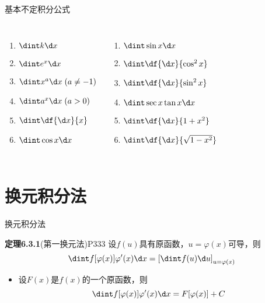 \begin{frame}{基本不定积分公式}
	\linespread{1.2}
	\begin{columns}\pause 
			\begin{enumerate}
			  \item $\dint k\d x$\pause 
			  \item $\dint e^x\d x$\pause 
			  \item $\dint x^a\d x\;(a\ne -1)$\pause 
			  \item $\dint a^x\d x\;(a>0)$\pause 
			  \item $\dint \df {\d x}{x}$\pause 
			  \item $\dint \cos x\d x$\pause 
			\end{enumerate}
			\begin{enumerate}
			  \addtocounter{enumi}{6} 
			  \item $\dint \sin x\d x$\pause 
			  \item $\dint \df{\d x}{\cos^2x}$\pause 
			  \item $\dint \df{\d x}{\sin^2 x}$\pause 
			  \item $\dint \sec x\tan x \d x$\pause 
			  \item $\dint \df{\d x}{1+x^2}$\pause 
			  \item $\dint \df{\d x}{\sqrt{1-x^2}}$
			\end{enumerate}
	\end{columns}
\end{frame}

\section{换元积分法}

\begin{frame}{换元积分法}
	\linespread{1.2}\pause 
	\begin{block}{{\bf 定理6.3.1}(第一换元法)\hfill P333}
		设$f(u)$具有原函数，$u=\varphi(x)$可导，则
		$$\dint f[\varphi(x)]\varphi'(x)\d x=\left[\dint f(u)
		\d u\right]_{u=\varphi(x)}$$
	\end{block}\pause 
	\begin{itemize}
	  \item 设$F(x)$是$f(x)$的一个原函数，则
	  $$\dint f[\varphi(x)]\varphi'(x)\d x=F[\varphi(x)]+C$$
	\end{itemize}
\end{frame}

